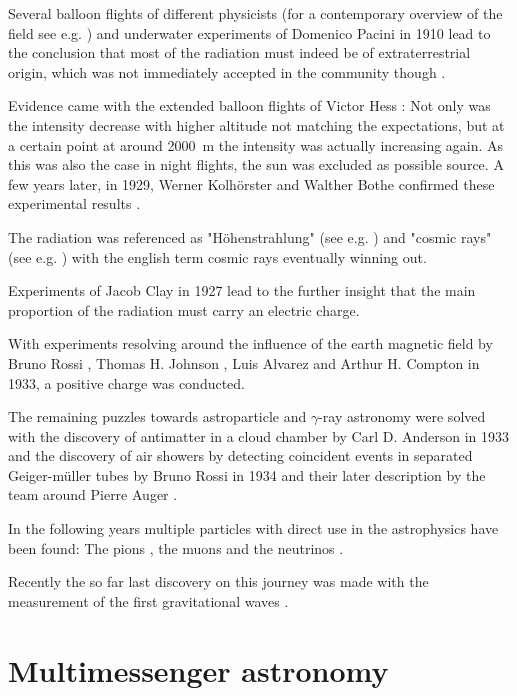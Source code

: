 Several balloon flights 
of different physicists (for a contemporary overview of the field see e.g. \cite{luftelektrizitaet})
and underwater experiments of Domenico Pacini in 1910 
\cite{2011arXiv1101.3015P}
lead to the conclusion that most of the radiation must indeed be
of extraterrestrial origin, which was not immediately accepted 
in the community though \cite{bookap}.

Evidence came with the extended balloon flights of Victor Hess
\cite{Hess:1912srp}:
Not only was the intensity decrease with higher altitude not 
matching the expectations, but at a certain point at around 
\SI{2000}{\meter} the intensity 
was actually increasing again.
As this was also the case in night flights, the sun
was excluded as possible source.
A few years later, in 1929, Werner Kolhörster and 
Walther Bothe confirmed these experimental results \cite{bothe1929wesen}.

The radiation was referenced as "Höhenstrahlung" 
(see e.g. \cite{myssowsky1926versuche}) 
and "cosmic rays" (see e.g. \cite{millikan1928origin}) with 
the english term cosmic rays eventually winning out.

Experiments of Jacob Clay in 1927 
\cite{clay1927penetrating}
lead to the further insight that the main proportion of 
the radiation must carry an electric charge.

With experiments resolving around the influence of the earth magnetic 
field by 
Bruno Rossi \cite{Rossi1933},
Thomas H. Johnson \cite{PhysRev.43.834},
Luis Alvarez and Arthur H. Compton \cite{PhysRev.43.835}
in 1933,
a positive charge was conducted.

The remaining puzzles towards astroparticle and $\gamma$-ray
astronomy were solved with the discovery of antimatter in a cloud chamber
by Carl D. Anderson in 1933 \cite{PhysRev.43.491}
and the discovery of air showers by detecting coincident 
events in separated Geiger-müller tubes by 
Bruno Rossi in 1934
\cite{PhysRev.45.212}
and their later description by
the team around Pierre Auger 
\cite{RevModPhys.11.288}.

In the following years multiple particles with direct use in the 
astrophysics have been found:
The pions \cite{LATTES1947}, the muons \cite{PhysRev.52.1003}
and the neutrinos \cite{Cowan103}.

Recently the so far last discovery on this journey
was made with the measurement of the first gravitational 
waves \cite{PhysRevLett.118.221101}.

\section{Multimessenger astronomy}

